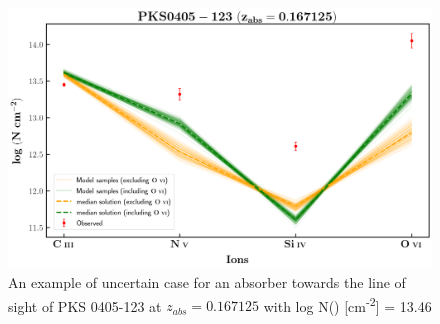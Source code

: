 \begin{figure}
    \centering
    \includegraphics[width=0.9\linewidth]{Figures/pks0405-z=0.167125-compII.png}
    \caption{An example of uncertain case for an absorber towards the line of sight of PKS 0405-123 at $z_{abs}=0.167125$ with log N() [cm\textsuperscript{-2}] = 13.46}
    \label{fig:ex-uncertain}
\end{figure}


